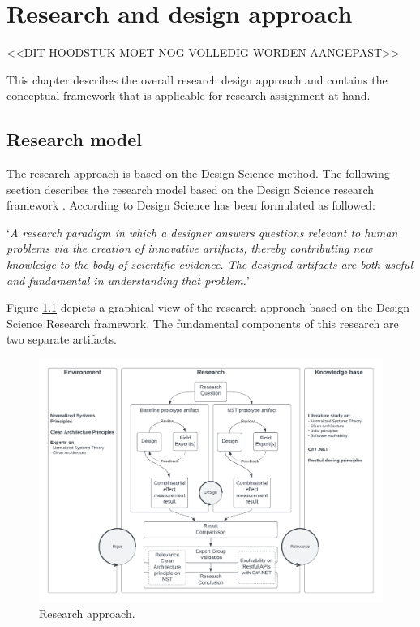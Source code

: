 \chapter{Research and design approach} \label{research_and_design_approach}

<<DIT HOODSTUK MOET NOG VOLLEDIG WORDEN AANGEPAST>>

This chapter describes the overall research design approach and contains the conceptual
framework that is applicable for research assignment at hand. 

\section{Research model}
The research approach is based on the Design Science method. The following section
describes the research model based on the Design Science research framework \parencite[(P.
107)]{recker_scientific_2013}. According to \citeauthor{recker_scientific_2013} Design
Science has been formulated as followed:

\begin{center}
    \enquote*{\textit{A research paradigm in which a designer answers questions relevant
    to human problems via the creation of innovative artifacts, thereby contributing new
    knowledge to the body of scientific evidence. The designed artifacts are both useful
    and fundamental in understanding that problem.}}
\end{center}
Figure \ref{fig:reserach_approach} depicts a graphical view of the research approach based
on the Design Science Research framework. The fundamental components of this research are
two separate artifacts. 

\begin{figure}[!h]
    \centering
    \includegraphics[width=1\textwidth]{Figures/research_approach}
    \caption[Research approach]{Research approach.}
    \label{fig:reserach_approach}
\end{figure}

